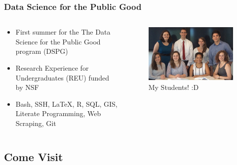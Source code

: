 \documentclass[compress]{beamer}
\begin{document}
	\begin{frame}[Basic2] \frametitle{Data Science for the Public Good}
		
		\begin{columns}
			\begin{column}{0.5\textwidth}
				\begin{itemize}
					\item First summer for the The Data Science for the Public Good program (DSPG)
					\item Research Experience for Undergraduates (REU) funded by NSF
					\item Bash, SSH, \LaTeX, R, SQL, GIS, Literate Programming, Web Scraping, Git
				\end{itemize}
			\end{column}
			\begin{column}{0.5\textwidth}
				\begin{figure}
					\centering
					\includegraphics[width=0.9\linewidth]{../figures/data-science-for-public-good-student-photo-overview}
					\caption{My Students! :D}
					\label{fig:data-science-for-public-good-student-photo-overview}
				\end{figure}
			\end{column}
		\end{columns}
	\end{frame}

\subsection[Come Visit]{Come Visit}
\end{document}
